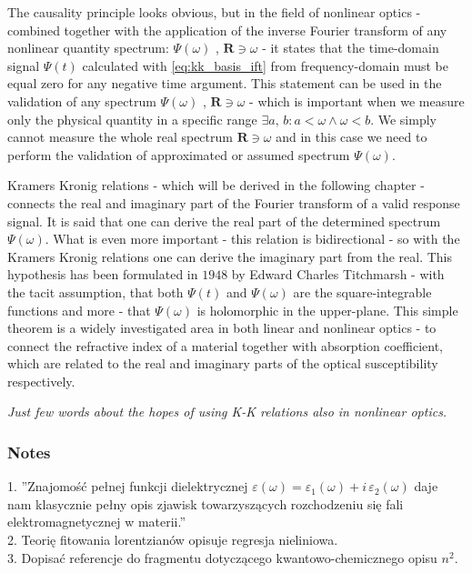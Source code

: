 \documentclass[12pt,twoside,a4paper]{article}
\numberwithin{equation}{subsection}
\numberwithin{figure}{subsection}
\begin{document}
The causality principle looks obvious, but in the field of nonlinear optics - combined together with the application of the inverse Fourier
transform of any nonlinear quantity spectrum: $\Psi (\omega )$ , $\textbf{R} \ni \omega$ - it states that the time-domain signal 
$\Psi (t)$ calculated with \ref{eq:kk_basis_ift} from frequency-domain must be equal zero for any negative time argument. This
statement can be used in the validation of any spectrum $\Psi (\omega )$ , $\textbf{R} \ni \omega$ - which is important when we
measure only the physical quantity in a specific range $\exists a,\,b : a < \omega \wedge \omega < b$. We simply cannot measure the
whole real spectrum $\textbf{R} \ni \omega $ and in this case we need to perform the validation of approximated or assumed spectrum $\Psi (\omega )$.

Kramers Kronig relations - which will be derived in the following chapter - connects the real and imaginary part of the Fourier
transform of a valid response signal. It is said that one can derive the real part of the determined spectrum $\Psi (\omega )$.
What is even more important - this relation is bidirectional - so with the Kramers Kronig relations one can derive the imaginary
part from the real. This hypothesis has been formulated in $1948$ by Edward Charles Titchmarsh - with the tacit assumption, that
both $\Psi (t)$ and $\Psi (\omega )$ are the square-integrable functions and more - that $\Psi (\omega )$ is holomorphic in the
upper-plane. This simple theorem is a widely investigated area in both linear and nonlinear optics - to connect the refractive
index of a material together with absorption coefficient, which are related to the real and imaginary parts of the optical
susceptibility respectively.

\textit{Just few words about the hopes of using K-K relations also in nonlinear optics.}

\subsubsection*{Notes}

1. ''Znajomość pełnej funkcji dielektrycznej $\varepsilon (\omega )={\varepsilon_{1}}(\omega ) + i\,{\varepsilon_{2}}(\omega )$
 daje nam klasycznie pełny opis zjawisk towarzyszących rozchodzeniu się fali elektromagnetycznej w materii.''\\
2. Teorię fitowania lorentzianów opisuje regresja nieliniowa.\\
3. Dopisać referencje do fragmentu dotyczącego kwantowo-chemicznego opisu $n^2$.
\end{document}
